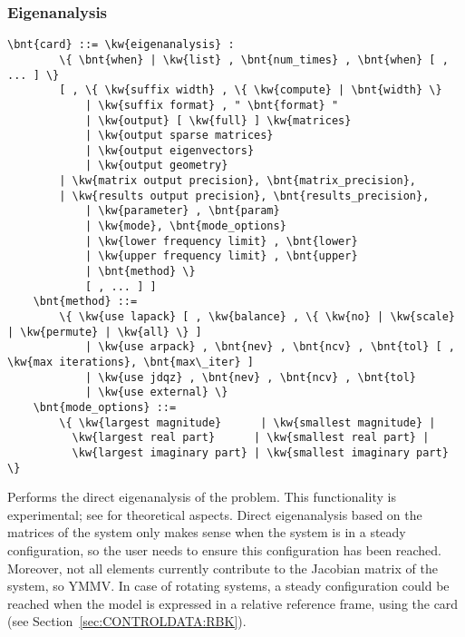 \subsubsection{Eigenanalysis}
\label{sec:IVP:eigenanalysis}
\begin{Verbatim}[commandchars=\\\{\}]
    \bnt{card} ::= \kw{eigenanalysis} :
        \{ \bnt{when} | \kw{list} , \bnt{num_times} , \bnt{when} [ , ... ] \}
        [ , \{ \kw{suffix width} , \{ \kw{compute} | \bnt{width} \}
            | \kw{suffix format} , " \bnt{format} "
            | \kw{output} [ \kw{full} ] \kw{matrices}
            | \kw{output sparse matrices}
            | \kw{output eigenvectors}
            | \kw{output geometry}
	    | \kw{matrix output precision}, \bnt{matrix_precision},
	    | \kw{results output precision}, \bnt{results_precision},
            | \kw{parameter} , \bnt{param}
            | \kw{mode}, \bnt{mode_options}
            | \kw{lower frequency limit} , \bnt{lower}
            | \kw{upper frequency limit} , \bnt{upper}
            | \bnt{method} \}
            [ , ... ] ]
    \bnt{method} ::=
        \{ \kw{use lapack} [ , \kw{balance} , \{ \kw{no} | \kw{scale} | \kw{permute} | \kw{all} \} ]
            | \kw{use arpack} , \bnt{nev} , \bnt{ncv} , \bnt{tol} [ , \kw{max iterations}, \bnt{max\_iter} ]
            | \kw{use jdqz} , \bnt{nev} , \bnt{ncv} , \bnt{tol}
            | \kw{use external} \}
    \bnt{mode_options} ::=
        \{ \kw{largest magnitude}      | \kw{smallest magnitude} |
          \kw{largest real part}      | \kw{smallest real part} |
          \kw{largest imaginary part} | \kw{smallest imaginary part} \}
\end{Verbatim}
Performs the direct eigenanalysis of the problem.
This functionality is experimental;
see \cite{MASARATI-2009} for theoretical aspects.
Direct eigenanalysis based on the matrices of the system
only makes sense when the system is in a steady configuration,
so the user needs to ensure this configuration has been reached.
Moreover, not all elements currently contribute to the Jacobian
matrix of the system, so YMMV.
In case of rotating systems, a steady configuration could be reached
when the model is expressed in a relative reference frame,
using the  card
(see Section~\ref{sec:CONTROLDATA:RBK}).

